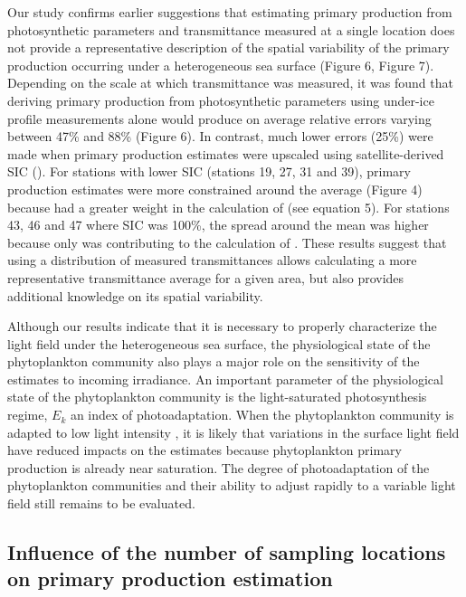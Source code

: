 Our study confirms earlier suggestions that estimating primary production from photosynthetic parameters and transmittance measured at a single location does not provide a representative description of the spatial variability of the primary production occurring under a heterogeneous sea surface (Figure 6, Figure 7). Depending on the scale at which transmittance was measured, it was found that deriving primary production from photosynthetic parameters using under-ice profile  measurements alone would produce on average relative errors varying between 47\% and 88\% (Figure 6). In contrast, much lower errors (25\%) were made when primary production estimates were upscaled using satellite-derived SIC (\ppmixing{}). For stations with lower SIC (stations 19, 27, 31 and 39), primary production estimates were more constrained around the average (Figure 4) because \ppopenwater{} had a greater weight in the calculation of \ppmixing{} (see equation 5). For stations 43, 46 and 47 where SIC was 100\%, the spread around the mean was higher because only \ppunderice{} was contributing to the calculation of \ppmixing{}. These results suggest that using a distribution of measured transmittances allows calculating a more representative transmittance average for a given area, but also provides additional knowledge on its spatial variability.

Although our results indicate that it is necessary to properly characterize the light field under the heterogeneous sea surface, the physiological state of the phytoplankton community also plays a major role on the sensitivity of the estimates to incoming irradiance. An important parameter of the physiological state of the phytoplankton community is the light-saturated photosynthesis regime, $E_k$ an index of photoadaptation. When the phytoplankton community is adapted to low light intensity \citep [e.g.,][]{Lacour2017}, it is likely that variations in the surface light field have reduced impacts on the estimates because phytoplankton primary production is already near saturation. The degree of photoadaptation of the phytoplankton communities and their ability to adjust rapidly to a variable light field still remains to be evaluated.

\subsection{Influence of the number of sampling locations on primary production estimation}

